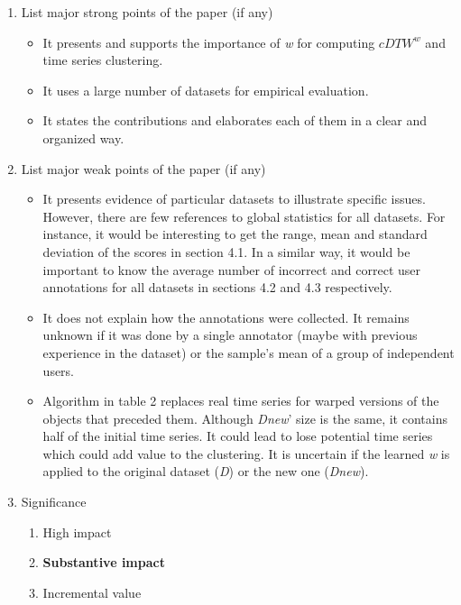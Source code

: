 \documentclass{article}
\begin{document}
\begin{enumerate}
 \item List major strong points of the paper (if any) \\ 
 \begin{framed}
  \begin{itemize}
    \item It presents and supports the importance of \textit{w} for computing $cDTW^w$ and time series clustering.
    \item It uses a large number of datasets for empirical evaluation.
    \item It states the contributions and elaborates each of them in a clear and organized way.
  \end{itemize}
 \end{framed}
 
 \item List major weak points of the paper (if any) \\ 
 \begin{framed}
  \begin{itemize}
    \item It presents evidence of particular datasets to illustrate specific issues.  However, there are few references to global statistics for all datasets.  For instance, it would be interesting to get the range, mean and standard deviation of the scores in section 4.1.  In a similar way, it would be important to know the average number of incorrect and correct user annotations for all datasets in sections 4.2 and 4.3 respectively.
    \item It does not explain how the annotations were collected.  It remains unknown if it was done by a single annotator (maybe with previous experience in the dataset) or the sample's mean of a group of independent users. 
    \item Algorithm in table 2 replaces real time series for warped versions of the objects that preceded them.  Although \textit{Dnew}' size is the same, it contains half of the initial time series.  It could lead to lose potential time series which could add value to the clustering. It is uncertain if the learned \textit{w} is applied to the original dataset (\textit{D}) or the new one (\textit{Dnew}).
  \end{itemize}
 \end{framed}

 \item Significance
 \begin{enumerate}[I]
  \item High impact
  \item \textbf{Substantive impact}
  \item Incremental value
 \end{enumerate} 
 

\end{enumerate}
\end{document}
